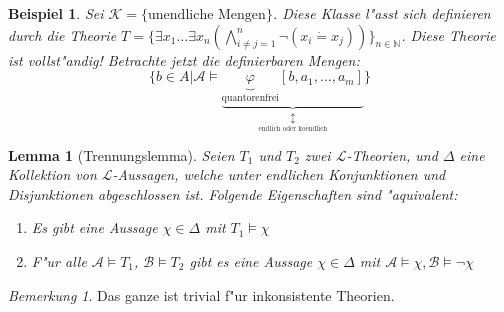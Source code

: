 \documentclass[a4paper,12pt,numbers=noenddot,parskip=full]{scrartcl}
\newcommand{\setN}{\mathbb{N}}
\newcommand{\scrL}{\mathcal{L}}
\newcommand{\scrA}{\mathcal{A}}
\newcommand{\scrB}{\mathcal{B}}
\theoremstyle{dotless}
\newtheorem{lemma}[theorem]{Lemma}
\newtheorem{example}[theorem]{Beispiel}
\theoremstyle{remark}
\newtheorem*{remark}{Bemerkung}
\begin{document}
\begin{example}
	Sei $\mathcal{K} = \{\text{unendliche Mengen}\}$. Diese Klasse l"asst sich definieren durch die Theorie $T=\{\exists x_1 \dots \exists x_n(\bigwedge\limits^n_{i \neq j =1}\lnot(x_i \dot= x_j))\}_{n \in \setN}$.
	Diese Theorie ist vollst"andig!
	Betrachte jetzt die definierbaren Mengen:
	\begin{equation*}
		\{b \in A | \scrA \models \underbrace{\underbrace{\varphi}_{\text{quantorenfrei}}[b, a_1, \dots, a_m]}_{\underset{\text{endlich oder koendlich}}{\updownarrow}} \}
	\end{equation*}
\end{example}

\begin{lemma}[Trennungslemma]
	Seien $T_1$ und $T_2$ zwei $\scrL$-Theorien, und $\Delta$ eine Kollektion von $\scrL$-Aussagen, welche unter endlichen Konjunktionen und Disjunktionen abgeschlossen ist. Folgende Eigenschaften sind "aquivalent:
	\begin{enumerate}
		\item Es gibt eine Aussage $\chi \in \Delta$ mit $T_1 \models \chi$
		\item F"ur alle $\scrA \models T_1$, $\scrB \models T_2$ gibt es eine Aussage $\chi \in \Delta$ mit $ \scrA \models \chi, \scrB \models \lnot \chi$
	\end{enumerate}
\end{lemma}

\begin{remark}
	Das ganze ist trivial f"ur inkonsistente Theorien.
\end{remark}
\end{document}
